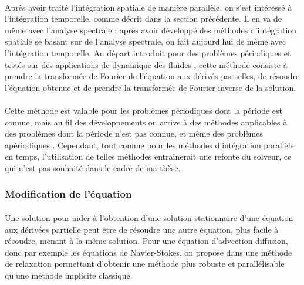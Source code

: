       \paragraph{}
      Après avoir traité l'intégration spatiale de manière parallèle, on s'est intéressé à l'intégration temporelle, comme décrit dans la section précédente.
      Il en va de même avec l'analyse spectrale : après avoir développé des méthodes d'intégration spatiale se basant sur de l'analyse spectrale, on fait aujourd'hui de même avec l'intégration temporelle.
      Au départ introduit pour des problèmes périodiques et testés sur des applications de dynamique des fluides \cite{GopinathJameson2005, GopinathJameson2006}, cette méthode consiste à prendre la transformée de Fourier de l'équation aux dérivés partielles, de résoudre l'équation obtenue et de prendre la transformée de Fourier inverse de la solution.

      \paragraph{}
      Cette méthode est valable pour les problèmes périodiques dont la période est connue, mais au fil des développements on arrive à des méthodes applicables à des problèmes dont la période n'est pas connue, et même des problèmes apériodiques \cite{EkiciDjeddiLiEtAl2020}.
      Cependant, tout comme pour les méthodes d'intégration parallèle en temps, l'utilisation de telles méthodes entraînerait une refonte du solveur, ce qui n'est pas souhaité dans le cadre de ma thèse.


    \subsubsection{Modification de l'équation}

      \paragraph{}
      Une solution pour aider à l'obtention d'une solution stationnaire d'une équation aux dérivées partielle peut être de résoudre une autre équation, plus facile à résoudre, menant à la même solution.
      Pour une équation d'advection diffusion, donc par exemple les équations de Navier-Stokes, on propose dans \cite{CouletteFranckHelluyEtAl2019} une méthode de relaxation permettant d'obtenir une méthode plus robuste et parallélisable qu'une méthode implicite classique.
